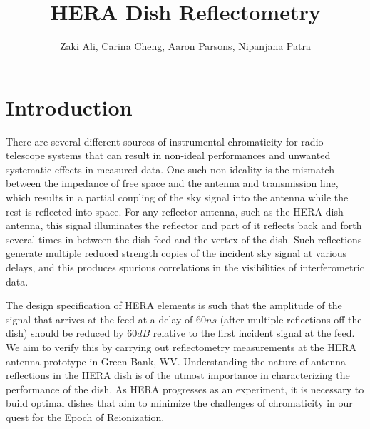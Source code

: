 \documentclass[12pt,preprint]{aastex}
\begin{document}
\title{HERA Dish Reflectometry} 
\author{Zaki Ali, Carina Cheng, Aaron Parsons, Nipanjana Patra}
\maketitle

\section{Introduction}

There are several different sources of instrumental chromaticity for radio
telescope systems that can result in non-ideal performances and unwanted
systematic effects in measured data. One such non-ideality is the mismatch
between the impedance of free space and the antenna and transmission line,
which results in a partial coupling of the sky signal into the antenna while
the rest is reflected into space. For any reflector antenna, such as the HERA
dish antenna, this signal illuminates the reflector and part of it reflects
back and forth several times in between the dish feed and the vertex of the
dish.  Such reflections generate multiple reduced strength copies of the
incident sky signal at various delays, and this produces spurious correlations
in the visibilities of interferometric data. 

The design specification of HERA elements is such that the amplitude of the
signal that arrives at the feed at a delay of $60ns$ (after multiple
reflections off the dish) should be reduced by $60dB$ relative to the first
incident signal at the feed. We aim to verify this by carrying out reflectometry measurements at the HERA antenna prototype in Green Bank, WV.
Understanding the nature of antenna reflections in the HERA dish is of the
utmost importance in characterizing the performance of the dish. As HERA
progresses as an experiment, it is necessary to build optimal dishes that aim
to minimize the challenges of chromaticity in our quest for the Epoch of
Reionization.
\end{document}
